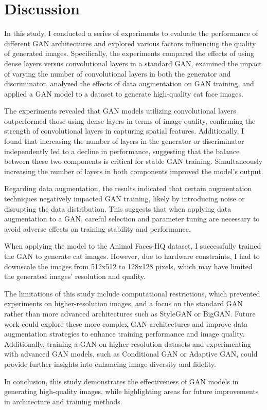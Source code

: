\section{Discussion}
\label{Discussion}

In this study, I conducted a series of experiments to evaluate the performance of different GAN architectures and explored various factors influencing the quality of generated images. Specifically, the experiments compared the effects of using dense layers versus convolutional layers in a standard GAN, examined the impact of varying the number of convolutional layers in both the generator and discriminator, analyzed the effects of data augmentation on GAN training, and applied a GAN model to a dataset to generate high-quality cat face images.

The experiments revealed that GAN models utilizing convolutional layers outperformed those using dense layers in terms of image quality, confirming the strength of convolutional layers in capturing spatial features. Additionally, I found that increasing the number of layers in the generator or discriminator independently led to a decline in performance, suggesting that the balance between these two components is critical for stable GAN training. Simultaneously increasing the number of layers in both components improved the model's output.

Regarding data augmentation, the results indicated that certain augmentation techniques negatively impacted GAN training, likely by introducing noise or disrupting the data distribution. This suggests that when applying data augmentation to a GAN, careful selection and parameter tuning are necessary to avoid adverse effects on training stability and performance.

When applying the model to the Animal Faces-HQ dataset, I successfully trained the GAN to generate cat images. However, due to hardware constraints, I had to downscale the images from 512x512 to 128x128 pixels, which may have limited the generated images' resolution and quality.

The limitations of this study include computational restrictions, which prevented experiments on higher-resolution images, and a focus on the standard GAN rather than more advanced architectures such as StyleGAN or BigGAN. Future work could explore these more complex GAN architectures and improve data augmentation strategies to enhance training performance and image quality. Additionally, training a GAN on higher-resolution datasets and experimenting with advanced GAN models, such as Conditional GAN or Adaptive GAN, could provide further insights into enhancing image diversity and fidelity.

In conclusion, this study demonstrates the effectiveness of GAN models in generating high-quality images, while highlighting areas for future improvements in architecture and training methods.